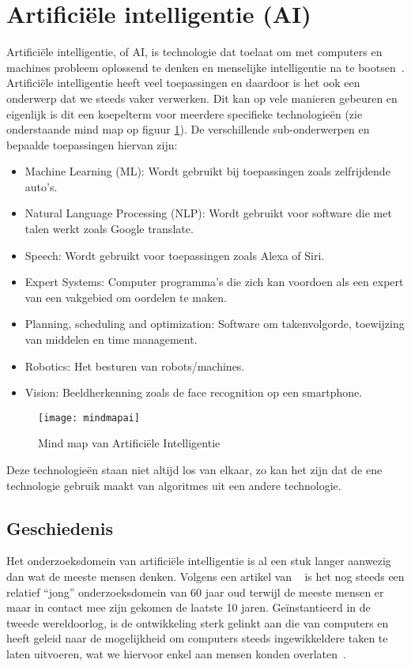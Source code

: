 \section{Artificiële intelligentie (AI)}
Artificiële intelligentie, of AI, is technologie dat toelaat om met computers en machines probleem oplossend te denken en menselijke intelligentie na te bootsen~\autocite{IBMc}. Artificiële intelligentie heeft veel toepassingen en daardoor is het ook een onderwerp dat we steeds vaker verwerken. 
Dit kan op vele manieren gebeuren en eigenlijk is dit een koepelterm voor meerdere specifieke technologieën (zie onderstaande mind map op figuur \ref{fig:mindmap}). De verschillende sub-onderwerpen en bepaalde toepassingen hiervan zijn: 

\begin{itemize}
    \item Machine Learning (ML): Wordt gebruikt bij toepassingen zoals zelfrijdende auto's.
    \item Natural Language Processing (NLP): Wordt gebruikt voor software die met talen werkt zoals Google translate.
    \item Speech: Wordt gebruikt voor toepassingen zoals Alexa of Siri.
    \item Expert Systems: Computer programma's die zich kan voordoen als een expert van een vakgebied om oordelen te maken. 
    \item Planning, scheduling and optimization: Software om takenvolgorde, toewijzing van middelen en time management.  
    \item Robotics: Het besturen van robots/machines. 
    \item Vision: Beeldherkenning zoals de face recognition op een smartphone.
\end{itemize}


\begin{figure}
    \centering
    \texttt{[image: mindmapai]}
    \caption{Mind map van Artificiële Intelligentie}
    \label{fig:mindmap}
\end{figure}

Deze technologieën staan niet altijd los van elkaar, zo kan het zijn dat de ene technologie gebruik maakt van algoritmes uit een andere technologie. 

\subsection{Geschiedenis}
Het onderzoeksdomein van artificiële intelligentie is al een stuk langer aanwezig dan wat de meeste mensen denken. Volgens een artikel van ~\textcite{Europe} is het nog steeds een relatief “jong” onderzoeksdomein van 60 jaar oud terwijl de meeste mensen er maar in contact mee zijn gekomen de laatste 10 jaren.  Geïnstantieerd in de tweede wereldoorlog, is de ontwikkeling sterk gelinkt aan die van computers en heeft geleid naar de mogelijkheid om computers steeds ingewikkeldere taken te laten uitvoeren, wat we hiervoor enkel aan mensen konden overlaten~\autocite{Europe}.

